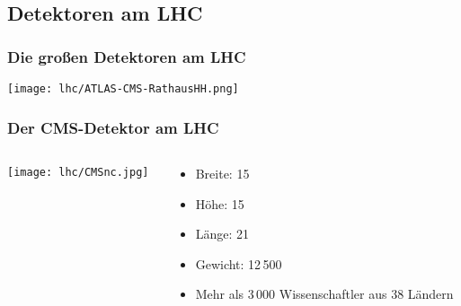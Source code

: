 \begin{frame}
\begin{columns}[T]
\begin{column}{0.65\textwidth}
\begin{columns}[T]
\begin{column}{0.6\textwidth}
\begin{itemize}
\begin{itemize}
            \end{itemize}
          \end{itemize}
        \end{column}
      \end{columns}
    \end{column}
    \begin{column}{0.35\textwidth}
      \centering
      \\
      \\
    \end{column}
  \end{columns}
\end{frame}


\subsection{Detektoren am LHC}
\begin{frame}
  \frametitle{Die gro\ss{}en Detektoren am LHC}
  \begin{center}
    \texttt{[image: lhc/ATLAS-CMS-RathausHH.png]}
  \end{center}
\end{frame}

\begin{frame}
  \frametitle{Der CMS-Detektor am LHC}
  \begin{columns}
    \begin{column}{0.6\textwidth}
      \texttt{[image: lhc/CMSnc.jpg]}
    \end{column}
    \begin{column}{0.4\textwidth}
      \begin{block}{}
        \begin{itemize}
        \item Breite: 15\m
        \item H\"ohe: 15\m
        \item L\"ange: 21\m
        \item Gewicht: 12\,500\tons
        \item Mehr als 3\,000 Wissenschaftler aus 38 L\"andern
        \end{itemize}
      \end{block}
    \end{column}
  \end{columns}
\end{frame}

